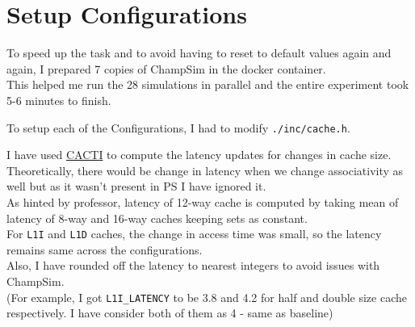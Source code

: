 \documentclass[11pt, swedish, openany]{book}
\begin{document}
\section{Setup Configurations}

To speed up the task and to avoid having to reset to default values again and again, I prepared 7 copies of ChampSim in the docker container. \\
This helped me run the 28 simulations in parallel and the entire experiment took 5-6 minutes to finish.

To setup each of the Configurations, I had to modify \texttt{./inc/cache.h}.

I have used \hyperlink{https://github.com/HewlettPackard/cacti}{CACTI} to compute the latency updates for changes in cache size. \\
Theoretically, there would be change in latency when we change associativity as well but as it wasn't present in PS I have ignored it. \\
As hinted by professor, latency of 12-way cache is computed by taking mean of latency of 8-way and 16-way caches keeping sets as constant. \\
For \texttt{L1I} and \texttt{L1D} caches, the change in access time was small, so the latency remains same across the configurations. \\
Also, I have rounded off the latency to nearest integers to avoid issues with ChampSim. \\
(For example, I got \texttt{L1I\_LATENCY} to be 3.8 and 4.2 for half and double size cache respectively. I have consider both of them as 4 - same as baseline) \\


\newpage
\end{document}
